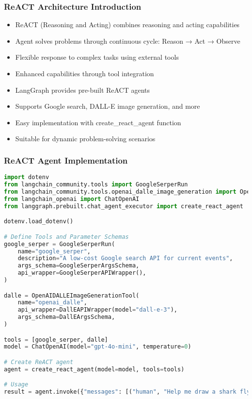 \begin{frame}[fragile]\frametitle{ReACT Architecture Introduction}
      \begin{itemize}
        \item ReACT (Reasoning and Acting) combines reasoning and acting capabilities
        \item Agent solves problems through continuous cycle: Reason → Act → Observe
        \item Flexible response to complex tasks using external tools
        \item Enhanced capabilities through tool integration
        \item LangGraph provides pre-built ReACT agents
        \item Supports Google search, DALL-E image generation, and more
        \item Easy implementation with create\_react\_agent function
        \item Suitable for dynamic problem-solving scenarios
      \end{itemize}
\end{frame}

\begin{frame}[fragile]\frametitle{ReACT Agent Implementation}
      \begin{lstlisting}[language=Python, basicstyle=\tiny]
import dotenv
from langchain_community.tools import GoogleSerperRun
from langchain_community.tools.openai_dalle_image_generation import OpenAIDALLEImageGenerationTool
from langchain_openai import ChatOpenAI
from langgraph.prebuilt.chat_agent_executor import create_react_agent

dotenv.load_dotenv()

# Define Tools and Parameter Schemas
google_serper = GoogleSerperRun(
    name="google_serper",
    description="A low-cost Google search API for current events",
    args_schema=GoogleSerperArgsSchema,
    api_wrapper=GoogleSerperAPIWrapper(),
)

dalle = OpenAIDALLEImageGenerationTool(
    name="openai_dalle",
    api_wrapper=DallEAPIWrapper(model="dall-e-3"),
    args_schema=DallEArgsSchema,
)

tools = [google_serper, dalle]
model = ChatOpenAI(model="gpt-4o-mini", temperature=0)

# Create ReACT agent
agent = create_react_agent(model=model, tools=tools)

# Usage
result = agent.invoke({"messages": [("human", "Help me draw a shark flying in the sky")]})
      \end{lstlisting}
\end{frame}

